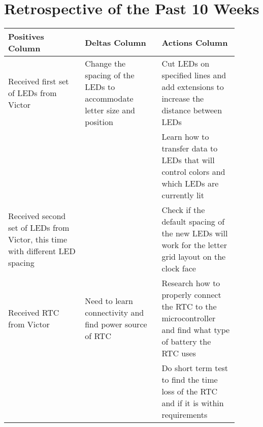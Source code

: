 \documentclass[10pt,draftclsnofoot,onecolumn]{IEEEtran}
\begin{document}
\section{Retrospective of the Past 10 Weeks}
\begin{center}
\begin{tabular}{| p{0.3\linewidth} | p{0.3\linewidth} | p{0.3\linewidth} |}
\hline
Positives Column & 
Deltas Column & 
Actions Column \\
\hline
Received first set of LEDs from Victor &
Change the spacing of the LEDs to accommodate letter size and position &
Cut LEDs on specified lines and add extensions to increase the distance between LEDs \\
\hline
 &
 &
Learn how to transfer data to LEDs that will control colors and which LEDs are currently lit \\
\hline
Received second set of LEDs from Victor, this time with different LED spacing &
 &
Check if the default spacing of the new LEDs will work for the letter grid layout on the clock face \\
\hline
Received RTC from Victor &
Need to learn connectivity and find power source of RTC &
Research how to properly connect the RTC to the microcontroller and find what type of battery the RTC uses \\
\hline
 &
 &
Do short term test to find the time loss of the RTC and if it is within requirements \\
\hline

\end{tabular}
\end{center}
\end{document}
